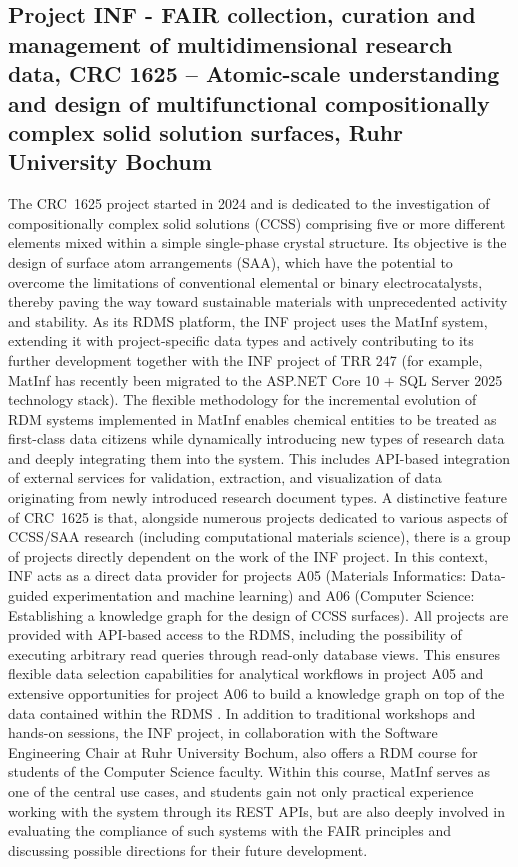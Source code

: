 \documentclass{eceasst}
\begin{document}
\subsection{Project INF - FAIR collection, curation and management of multidimensional research data, CRC 1625 – Atomic-scale understanding and design of multifunctional compositionally complex solid solution surfaces, Ruhr University Bochum}
The CRC~1625 project started in 2024 and is dedicated to the investigation of compositionally complex solid solutions (CCSS) comprising five or more different elements mixed within a simple single-phase crystal structure.
Its objective is the design of surface atom arrangements (SAA), which have the potential to overcome the limitations of conventional elemental or binary electrocatalysts, thereby paving the way toward sustainable materials with unprecedented activity and stability.
As its RDMS platform, the INF project uses the MatInf system, extending it with project-specific data types and actively contributing to its further development together with the INF project of TRR 247 (for example, MatInf has recently been migrated to the ASP.NET Core 10 + SQL Server 2025 technology stack).
The flexible methodology for the incremental evolution of RDM systems implemented in MatInf \cite{Dudarev2026} enables chemical entities to be treated as first-class data citizens while dynamically introducing new types of research data and deeply integrating them into the system.
This includes API-based integration of external services for validation, extraction, and visualization of data originating from newly introduced research document types.
A distinctive feature of CRC~1625 is that, alongside numerous projects dedicated to various aspects of CCSS/SAA research (including computational materials science), there is a group of projects directly dependent on the work of the INF project.
In this context, INF acts as a direct data provider for projects A05 (Materials Informatics: Data-guided experimentation and machine learning) and A06 (Computer Science: Establishing a knowledge graph for the design of CCSS surfaces).
All projects are provided with API-based access to the RDMS, including the possibility of executing arbitrary read queries through read-only database views.
This ensures flexible data selection capabilities for analytical workflows in project A05 and extensive opportunities for project A06 to build a knowledge graph on top of the data contained within the RDMS \cite{Mohamed2026}.
In addition to traditional workshops and hands-on sessions, the INF project, in collaboration with the Software Engineering Chair at Ruhr University Bochum, also offers a RDM course for students of the Computer Science faculty.
Within this course, MatInf serves as one of the central use cases, and students gain not only practical experience working with the system through its REST APIs, but are also deeply involved in evaluating the compliance of such systems with the FAIR principles and discussing possible directions for their future development.
\end{document}
